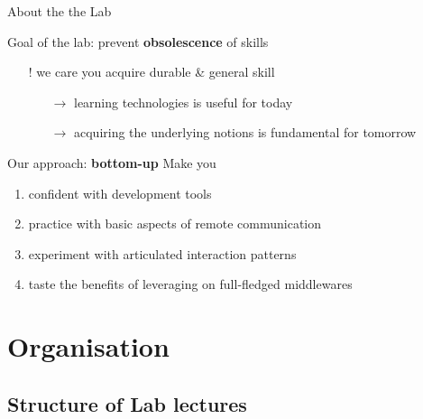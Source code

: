 \documentclass[presentation]{beamer}\mode<presentation>{\usetheme{AMSBolognaFC}}
\begin{document}
\begin{frame}[c, allowframebreaks]{About the the Lab}
\begin{block}{Goal of the lab: prevent \textbf{obsolescence} of skills}
\begin{itemize}
            \item[!] we care you acquire durable \& general skill
            \begin{itemize}
                \item[$\rightarrow$] learning technologies is useful for today
                \item[$\rightarrow$] acquiring the underlying notions is fundamental for tomorrow
            \end{itemize}
        \end{itemize}
    \end{block}

    \begin{block}{Our approach: \textbf{bottom-up}}
        Make you
        \begin{enumerate}
            \item confident with \alert{development tools}
            \item practice with basic aspects of \alert{remote communication}
            \item experiment with articulated \alert{interaction patterns}
            \item taste the benefits of leveraging on full-fledged \alert{middlewares}
        \end{enumerate}
    \end{block}
\end{frame}

\section{Organisation}

\subsection{Structure of Lab lectures}
\end{document}
